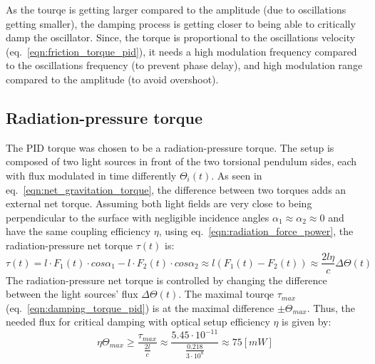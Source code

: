 \documentclass[\main/master.tex]{subfiles}
\begin{document}
\par\noindent
As the tourqe is getting larger compared to the amplitude (due to oscillations getting smaller), the damping process is getting closer to being able to critically damp the oscillator.
Since, the torque is proportional to the oscillations velocity (eq.~\ref{eqn:friction_torque_pid}), it needs a high modulation frequency compared to the oscillations frequency (to prevent phase delay), and high modulation range compared to the amplitude (to avoid overshoot). 
\subsection{Radiation-pressure torque}
The PID torque was chosen to be a radiation-pressure torque. The setup is composed of two light sources in front of the two torsional pendulum sides, each with flux modulated in time differently $\Theta_i(t)$. As seen in eq.~\ref{eqn:net_gravitation_torque}, the difference between two torques adds an external net torque. Assuming both light fields are very close to being perpendicular to the surface with negligible incidence angles $\alpha_1\approx\alpha_2\approx 0$ and have the same coupling efficiency $\eta$, using eq.~\ref{eqn:radiation_force_power}, the radiation-pressure net torque $\tau(t)$ is:  
\begin{equation}
\tau(t) = l\cdot F_1(t) \cdot cos\alpha_1 - l\cdot F_2(t) \cdot cos\alpha_2\approx l(F_1(t) - F_2(t)) \approx \frac{2l\eta}{{c}} \Delta \Theta(t) \label{eqn:radiation torque}
\end{equation}
The radiation-pressure net torque is controlled by changing the difference between the light sources' flux $\Delta \Theta(t)$. The maximal tourqe $\tau_{max}$ (eq.~\ref{eqn:damping_torque_pid}) is at the maximal difference $\pm \Theta_{max}$. Thus, the needed flux for critical damping with optical setup efficiency $\eta$ is given by: 
\begin{equation}
\eta\Theta_{max} \geq \frac{\tau_{max}}{\frac{2 l}{c}}\approx \frac{5.45\cdot10^{-11}}{\frac{ 0.218}{3\cdot10^{8}}}\approx 75 [mW]
\label{eqn:max radiation torque}
\end{equation}
\end{document}
